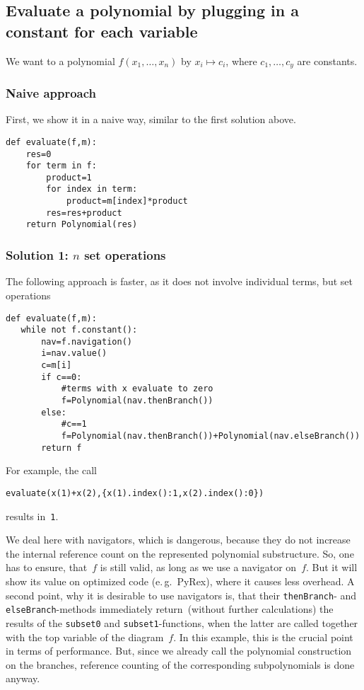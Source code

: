 \documentclass[]{article}
\begin{document}
\subsection{Evaluate a polynomial by plugging in a constant for each variable}
    We want to a polynomial
    $f(x_1,\ldots, x_n)$
    by
    $x_i\mapsto c_i$, where
    $c_1,\ldots, c_y$ are constants.
\subsubsection{Naive approach}
First, we show it in a naive way, similar to the first solution above.

\begin{verbatim}
def evaluate(f,m):
    res=0
    for term in f:
        product=1
        for index in term:
            product=m[index]*product
        res=res+product
    return Polynomial(res)
\end{verbatim}


\subsubsection{Solution 1: $n$ set operations}
The following approach is faster, as it does not involve individual terms, but set operations

\begin{verbatim}
def evaluate(f,m):
   while not f.constant():
       nav=f.navigation()
       i=nav.value()
       c=m[i]
       if c==0:
           #terms with x evaluate to zero
           f=Polynomial(nav.thenBranch())
       else:
           #c==1
           f=Polynomial(nav.thenBranch())+Polynomial(nav.elseBranch())
       return f   
\end{verbatim}
For example, the call
\begin{verbatim}
evaluate(x(1)+x(2),{x(1).index():1,x(2).index():0})  
\end{verbatim}
results in~\verb|1|.



We deal here with navigators, which is dangerous, because
they do not increase the internal reference count on the represented polynomial
substructure. So, one has
to ensure, that~$f$ is still valid, as long as we use a navigator on~$f$.
But it will show its value on optimized code (e.\,g.\ PyRex), where it causes
less overhead. 
A second point, why it is desirable to use navigators is, that their
\verb|thenBranch|- and \verb|elseBranch|-methods immediately return~(without
further calculations) the
results of the \verb|subset0| and \verb|subset1|-functions, when the latter are
called together  with the top variable of the diagram~$f$.
%
In this example, this is the crucial point in terms of performance.
But, since we already call the polynomial construction on the branches,
reference counting of the corresponding subpolynomials is done anyway.
\end{document}

